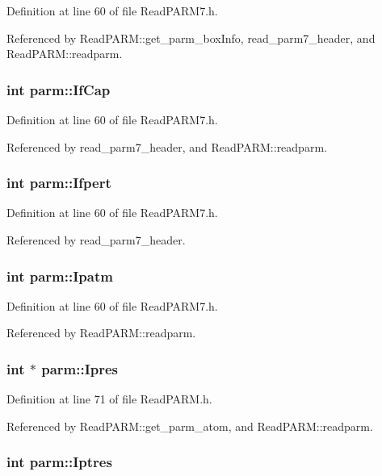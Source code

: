 Definition at line 60 of file Read\-PARM7.h.

Referenced by Read\-PARM::get\_\-parm\_\-box\-Info, read\_\-parm7\_\-header, and Read\-PARM::readparm.
\subsubsection{\setlength{\rightskip}{0pt plus 5cm}int parm::If\-Cap}\label{structparm_m3}




Definition at line 60 of file Read\-PARM7.h.

Referenced by read\_\-parm7\_\-header, and Read\-PARM::readparm.
\subsubsection{\setlength{\rightskip}{0pt plus 5cm}int parm::Ifpert}\label{structparm_m92}




Definition at line 60 of file Read\-PARM7.h.

Referenced by read\_\-parm7\_\-header.
\subsubsection{\setlength{\rightskip}{0pt plus 5cm}int parm::Ipatm}\label{structparm_m30}




Definition at line 60 of file Read\-PARM7.h.

Referenced by Read\-PARM::readparm.
\subsubsection{\setlength{\rightskip}{0pt plus 5cm}int $\ast$ parm::Ipres}\label{structparm_m58}




Definition at line 71 of file Read\-PARM.h.

Referenced by Read\-PARM::get\_\-parm\_\-atom, and Read\-PARM::readparm.
\subsubsection{\setlength{\rightskip}{0pt plus 5cm}int parm::Iptres}\label{structparm_m28}




